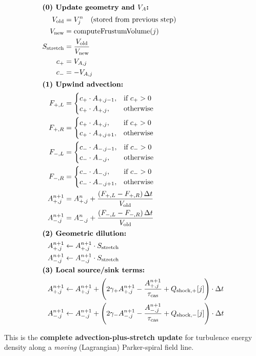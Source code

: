 \begin{align*}
\intertext{\textbf{(0) Update geometry and $V_A$:}}
V_{\text{old}} &= V_j^n \quad \text{(stored from previous step)} \\
V_{\text{new}} &= \text{computeFrustumVolume}(j) \\
S_{\text{stretch}} &= \frac{V_{\text{old}}}{V_{\text{new}}} \\
c_+ &= V_{A,j} \\
c_- &= -V_{A,j} \\
%
\intertext{\textbf{(1) Upwind advection:}}
F_{+,L} &= 
\begin{cases}
c_+ \cdot A_{+,j-1}, & \text{if } c_+ > 0 \\
c_+ \cdot A_{+,j},   & \text{otherwise}
\end{cases} \\
F_{+,R} &= 
\begin{cases}
c_+ \cdot A_{+,j},   & \text{if } c_+ > 0 \\
c_+ \cdot A_{+,j+1}, & \text{otherwise}
\end{cases} \\
F_{-,L} &= 
\begin{cases}
c_- \cdot A_{-,j-1}, & \text{if } c_- > 0 \\
c_- \cdot A_{-,j},   & \text{otherwise}
\end{cases} \\
F_{-,R} &= 
\begin{cases}
c_- \cdot A_{-,j},   & \text{if } c_- > 0 \\
c_- \cdot A_{-,j+1}, & \text{otherwise}
\end{cases} \\
A_{+,j}^{n+1} &= A_{+,j}^n + \frac{(F_{+,L} - F_{+,R}) \, \Delta t}{V_{\text{old}}} \\
A_{-,j}^{n+1} &= A_{-,j}^n + \frac{(F_{-,L} - F_{-,R}) \, \Delta t}{V_{\text{old}}} \\
%
\intertext{\textbf{(2) Geometric dilution:}}
A_{+,j}^{n+1} &\leftarrow A_{+,j}^{n+1} \cdot S_{\text{stretch}} \\
A_{-,j}^{n+1} &\leftarrow A_{-,j}^{n+1} \cdot S_{\text{stretch}} \\
%
\intertext{\textbf{(3) Local source/sink terms:}}
A_{+,j}^{n+1} &\leftarrow A_{+,j}^{n+1} + \left( 2 \gamma_+ A_{+,j}^{n+1} - \frac{A_{+,j}^{n+1}}{\tau_{\text{cas}}} + Q_{\text{shock},+}[j] \right) \cdot \Delta t \\
A_{-,j}^{n+1} &\leftarrow A_{-,j}^{n+1} + \left( 2 \gamma_- A_{-,j}^{n+1} - \frac{A_{-,j}^{n+1}}{\tau_{\text{cas}}} + Q_{\text{shock},-}[j] \right) \cdot \Delta t
\end{align*}


\bigskip

\noindent
This is the \textbf{complete advection-plus-stretch update} for turbulence energy density along a \emph{moving} (Lagrangian) Parker-spiral field line.

